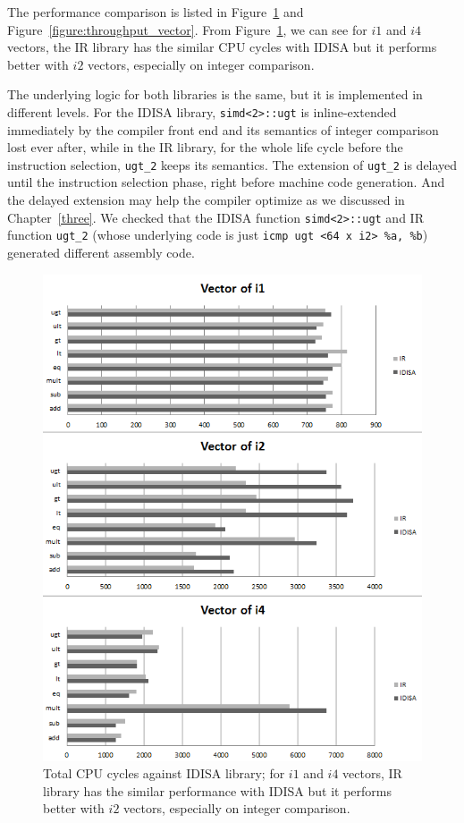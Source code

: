 The performance comparison is listed in Figure~\ref{figure:cpu_cycles_vector} and Figure~\ref{figure:throughput_vector}. From Figure~\ref{figure:cpu_cycles_vector}, we can see for $i1$ and $i4$ vectors, the IR library has the similar CPU cycles with IDISA but it performs better with $i2$ vectors, especially on integer comparison.

The underlying logic for both libraries is the same, but it is implemented in different levels. For the IDISA library, {\tt simd<2>::ugt} is inline-extended immediately by the compiler front end and its semantics of integer comparison lost ever after, while in the IR library, for the whole life cycle before the instruction selection, {\tt ugt\_2} keeps its semantics. The extension of {\tt ugt\_2} is delayed until the instruction selection phase, right before machine code generation. And the delayed extension may help the compiler optimize as we discussed in Chapter~\ref{three}. We checked that the IDISA function {\tt simd<2>::ugt} and IR function {\tt ugt\_2} (whose underlying code is just \verb|icmp ugt <64 x i2> %a, %b|) generated different assembly code.

\begin{figure}[htbp!]
\centering
\includegraphics[width=140mm]{draw/cpu_cycles_vector.png}
\caption[Total CPU cycles against IDISA library]{Total CPU cycles against IDISA library; for $i1$ and $i4$ vectors, IR library has the similar performance with IDISA but it performs better with $i2$ vectors, especially on integer comparison.}
\label{figure:cpu_cycles_vector}
\end{figure}


